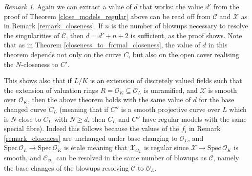 \documentclass{article}
\theoremstyle{definition}
\theoremstyle{plain}
\theoremstyle{remark}
\newtheorem{remark}[defn]{Remark}
\newcommand{\spec}{\mathrm{Spec}\,}
\begin{document}
	\begin{remark}\label{remark_precision}
	Again we can extract a value of $d$ that works: the value $d'$ from the proof of Theorem \ref{close_models_regular} above can be read off from $\mathcal{C}$ and $\mathcal{X}$ as in Remark \ref{remark_closeness}. If $n$ is the number of blowups necessary to resolve the singularities of $\mathcal{C}$, then $d = d' + n + 2$ is sufficient, as the proof shows. Note that as in Theorem \ref{closeness_to_formal_closeness}, the value of $d$ in this theorem depends not only on the curve $C$, but also on the open cover realising the $N$-closeness to $C'$.
	
	This shows also that if $L/K$ is an extension of discretely valued fields such that the extension of valuation rings $R = \mathcal{O}_K\subseteq \mathcal{O}_L$ is unramified, and $\mathcal{X}$ is smooth over $\mathcal{O}_K$, then the above theorem holds with the same value of $d$ for the base changed curve $C_L$ (meaning that if $C''$ is a smooth projective curve over $L$ which is $N$-close to $C_L$ with $N\ge d$, then $C_L$ and $C''$ have regular models with the same special fibre). Indeed this follows because the values of the $f_i$ in Remark \ref{remark_closeness} are unchanged under base changing to $\mathcal{O}_L$, and $\spec \mathcal{O}_L \to \spec \mathcal{O}_K$ is étale meaning that $\mathcal{X}_{\mathcal{O}_L}$ is regular since $\mathcal{X}\to\spec \mathcal{O}_K$ is smooth, and $\mathcal{C}_{\mathcal{O}_L}$ can be resolved in the same number of blowups as $\mathcal{C}$, namely the base changes of the blowups resolving $\mathcal{C}$ to $\mathcal{O}_L$.
	\end{remark}
\end{document}
